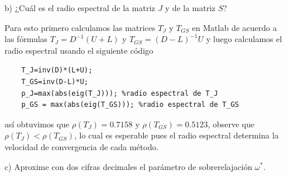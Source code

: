 \begin{enumerate}
    \item[b)] ¿Cuál es el radio espectral de la matriz $J$ y de la matriz $S$?

    \begin{solution}
        Para esto primero calculamos las matrices $T_J$ y $T_{GS}$ en Matlab de acuerdo a las fórmulas $T_J=D^{-1}(U+L)$ y $T_{GS} = (D-L)^{-1}U$ y luego calculamos el radio espectral usando el siguiente código
        \begin{lstlisting}
    T_J=inv(D)*(L+U); 
    T_GS=inv(D-L)*U;
    p_J=max(abs(eig(T_J))); %radio espectral de T_J
    p_GS = max(abs(eig(T_GS))); %radio espectral de T_GS
        \end{lstlisting}
        así obtuvimos que $\rho(T_J) = 0.7158$ y $\rho(T_{GS}) = 0.5123$, observe que $\rho(T_J) < \rho(T_{GS})$, lo cual es esperable pues el radio espectral determina la velocidad de convergencia de cada método.
    \end{solution}

    \item[c)] Aproxime con dos cifras decimales el parámetro de sobrerelajación $\omega^*$.


\end{enumerate}
